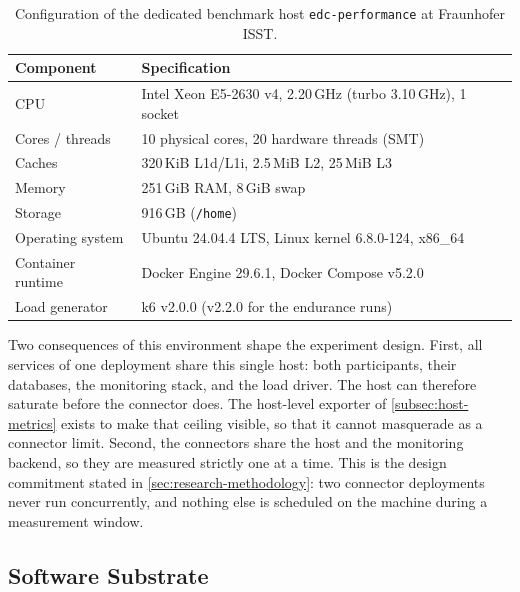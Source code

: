\begin{table}[ht]
    \centering
    \small
    \begin{tabularx}{0.86\textwidth}{@{}l X@{}}
        \toprule
        \textbf{Component} & \textbf{Specification} \\
        \midrule
        CPU & Intel Xeon E5-2630 v4, 2.20\,GHz (turbo 3.10\,GHz), 1 socket \\
        Cores / threads & 10 physical cores, 20 hardware threads (SMT) \\
        Caches & 320\,KiB L1d/L1i, 2.5\,MiB L2, 25\,MiB L3 \\
        Memory & 251\,GiB RAM, 8\,GiB swap \\
        Storage & 916\,GB (\texttt{/home}) \\
        Operating system & Ubuntu 24.04.4 LTS, Linux kernel 6.8.0-124, x86\_64 \\
        Container runtime & Docker Engine 29.6.1, Docker Compose v5.2.0 \\
        Load generator & k6 v2.0.0 (v2.2.0 for the endurance runs) \\
        \bottomrule
    \end{tabularx}
    \caption[Benchmark host configuration]{Configuration of the dedicated benchmark host \texttt{edc-performance} at Fraunhofer ISST.}
    \label{tab:hardware-config}
\end{table}

Two consequences of this environment shape the experiment design. First, all services of one deployment share this single host: both participants, their databases, the monitoring stack, and the load driver. The host can therefore saturate before the connector does. The host-level exporter of \cref{subsec:host-metrics} exists to make that ceiling visible, so that it cannot masquerade as a connector limit. Second, the connectors share the host and the monitoring backend, so they are measured strictly one at a time. This is the design commitment stated in \cref{sec:research-methodology}: two connector deployments never run concurrently, and nothing else is scheduled on the machine during a measurement window.

\subsection{Software Substrate}\label{subsec:substrate}


